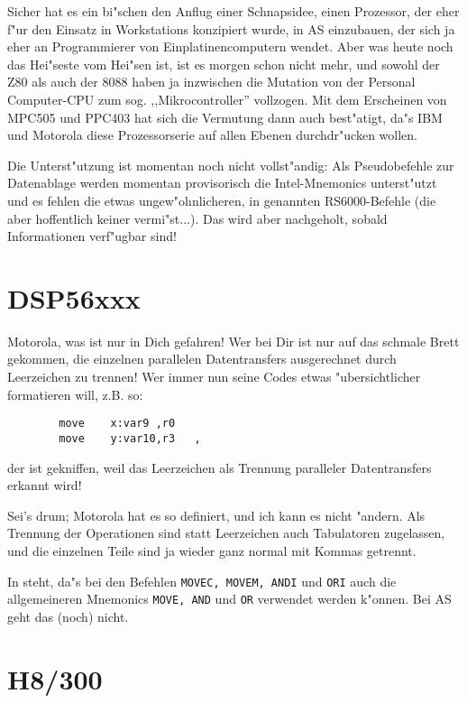 \documentclass[12pt,a4paper,twoside]{report}
\newcommand{\tty}[1]{{\tt #1}}
\begin{document}
Sicher hat es ein bi"schen den Anflug einer Schnapsidee, einen Prozessor,
der eher f"ur den Einsatz in Workstations konzipiert wurde, in AS
einzubauen, der sich ja eher an Programmierer von Einplatinencomputern
wendet.  Aber was heute noch das Hei"seste vom Hei"sen ist, ist es morgen
schon nicht mehr, und sowohl der Z80 als auch der 8088 haben ja inzwischen
die Mutation von der Personal Computer-CPU zum sog. ,,Mikrocontroller''
vollzogen.  Mit dem Erscheinen von MPC505 und PPC403 hat sich die Vermutung
dann auch best"atigt, da"s IBM und Motorola diese Prozessorserie auf allen
Ebenen durchdr"ucken wollen.
\par
Die Unterst"utzung ist momentan noch nicht vollst"andig: Als Pseudobefehle
zur Datenablage werden momentan provisorisch die Intel-Mnemonics
unterst"utzt und es fehlen die etwas ungew"ohnlicheren, in \cite{Mot601}
genannten RS6000-Befehle (die aber hoffentlich keiner vermi"st...).  Das
wird aber nachgeholt, sobald Informationen verf"ugbar sind!


\section{DSP56xxx}

Motorola, was ist nur in Dich gefahren!  Wer bei Dir ist nur auf das
schmale Brett gekommen, die einzelnen parallelen Datentransfers
ausgerechnet durch Leerzeichen zu trennen!  Wer immer nun seine Codes
etwas "ubersichtlicher formatieren will, z.B. so:
\begin{verbatim}
        move    x:var9 ,r0
        move    y:var10,r3   ,
\end{verbatim}
der ist gekniffen, weil das Leerzeichen als Trennung paralleler
Datentransfers erkannt wird!
\par
Sei's drum; Motorola hat es so definiert, und ich kann es nicht
"andern.  Als Trennung der Operationen sind statt Leerzeichen auch
Tabulatoren zugelassen, und die einzelnen Teile sind ja wieder ganz
normal mit Kommas getrennt.
\par
In \cite{Mot56} steht, da"s bei den Befehlen \tty{MOVEC, MOVEM, ANDI} und
\tty{ORI} auch die allgemeineren Mnemonics \tty{MOVE, AND} und \tty{OR}
verwendet werden k"onnen.  Bei AS geht das (noch) nicht.


\section{H8/300}
\end{document}

